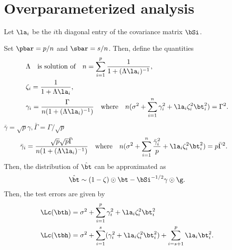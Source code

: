 \section{Overparameterized analysis}
Let $\la_i$ be the $i$th diagonal entry of the covariance matrix $\bSi$.
\begin{lemma} Set $\pbar=p/n$ and $\sbar=s/n$. Then, define the quantities
\begin{align}
&\Lambda\quad\text{is solution of}\quad n=\sum_{i=1}^p\frac{1}{1+(\Lambda\la_i)^{-1}},\\
&\zeta_i=\frac{1}{1+\Lambda \la_i},\\
&\gamma_i=\frac{\Gamma}{n(1+(\Lambda \la_i)^{-1})}\quad\text{where}\quad n(\sigma^2+\sum_{i=1}^n \gamma_i^2+\la_i\zeta_i^2\bt_i^2)=\Gamma^2.
\end{align}
$\bar{\gamma}=\sqrt{p}\gamma,\bar{\Gamma}=\Gamma/\sqrt{p}$
\begin{align}
&\bar{\gamma}_i=\frac{\sqrt{p}\sqrt{p}\bar{\Gamma}}{n(1+(\Lambda \la_i)^{-1})}\quad\text{where}\quad n(\sigma^2+\sum_{i=1}^n \frac{\bar{\gamma}_i^2}{p}+\la_i\zeta_i^2\bt_i^2)=p\bar{\Gamma}^2.
\end{align}
Then, the distribution of $\hat{\bt}$ can be approximated as
\[
\hat{\bt}\sim (1-\zeta)\odot\bt-\bSi^{-1/2}\gamma\odot\g.
\]
Then, the test errors are given by
\begin{align}
&\Lc(\bth)=\sigma^2+\sum_{i=1}^p\gamma_i^2+\la_i\zeta_i^2\bt_i^2\\
&\Lc(\tbh)=\sigma^2+\sum_{i=1}^s(\gamma_i^2+\la_i\zeta_i^2\bt_i^2)+\sum_{i=s+1}^p\la_i\bt_i^2.
\end{align}
\end{lemma}
